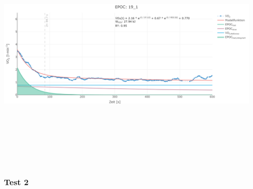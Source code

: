 \documentclass[
  letterpaper,
  DIV=11]{scrartcl}
\begin{document}
\includegraphics[width=11.45833in,height=4.6875in]{images/19_1.png}

\subsubsection{Test 2}
\end{document}

